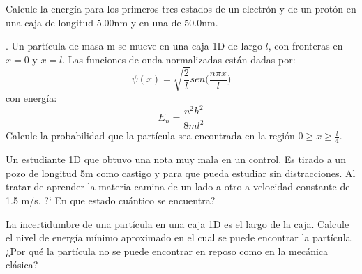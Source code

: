 \documentclass{../guias}
\begin{document}
\problem{} Calcule la energía para los primeros tres estados de un electrón y de un protón
en una caja de longitud $5.00$nm y en una de $50.0$nm.

\problem{}.
Un partícula de masa m se mueve en una caja 1D de largo $l$, con
fronteras en $x=0$ y $x=l$. Las funciones de onda normalizadas 
están dadas por: 
\begin{equation*}
    \psi(x) = \sqrt{\frac{2}{l}}sen\Big(\frac{n\pi x}{l}\Big)
\end{equation*}
con energía:
\begin{equation*}
    E_{n} = \frac{n^2h^2}{8ml^2}
\end{equation*}
Calcule la probabilidad que la partícula sea encontrada en la región $0 \geq x \geq \frac{l}{4}$.

\problem{} Un estudiante 1D que obtuvo una nota muy mala en un control. Es tirado a un pozo de longitud 5m como castigo y para 
           que pueda estudiar sin distracciones. Al tratar de aprender la materia camina  de un lado a otro
           a velocidad constante de 1.5 m/s. ?` En que estado cuántico se encuentra?

\problem{} La incertidumbre de una partícula en una caja 1D es el largo de la caja. Calcule el nivel de energía mínimo aproximado
en el cual se puede encontrar la partícula. ¿Por qué la partícula no se puede encontrar en reposo como en la mecánica clásica?  \\
\end{document}

